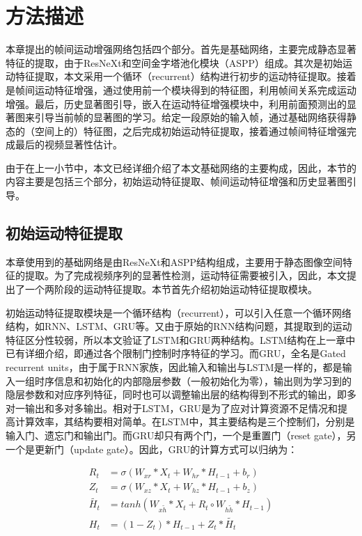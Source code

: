 \section{方法描述}
本章提出的帧间运动增强网络包括四个部分。首先是基础网络，主要完成静态显著特征的提取，由于ResNeXt和空间金字塔池化模块（ASPP）组成。其次是初始运动特征提取，本文采用一个循环（recurrent）结构进行初步的运动特征提取。接着是帧间运动特征增强，通过使用前一个模块得到的特征图，利用帧间关系完成运动增强。最后，历史显著图引导，嵌入在运动特征增强模块中，利用前面预测出的显著图来引导当前帧的显著图的学习。给定一段原始的输入帧，通过基础网络获得静态的（空间上的）特征图，之后完成初始运动特征提取，接着通过帧间特征增强完成最后的视频显著性估计。

由于在上一小节中，本文已经详细介绍了本文基础网络的主要构成，因此，本节的内容主要是包括三个部分，初始运动特征提取、帧间运动特征增强和历史显著图引导。

\subsection{初始运动特征提取}
本章使用到的基础网络是由ResNeXt和ASPP结构组成，主要用于静态图像空间特征的提取。为了完成视频序列的显著性检测，运动特征需要被引入，因此，本文提出了一个两阶段的运动特征提取。本节首先介绍初始运动特征提取模块。

初始运动特征提取模块是一个循环结构（recurrent），可以引入任意一个循环网络结构，如RNN、LSTM、GRU等。又由于原始的RNN结构问题，其提取到的运动特征区分性较弱，所以本文验证了LSTM和GRU两种结构。LSTM结构在上一章中已有详细介绍，即通过各个限制门控制时序特征的学习。而GRU，全名是Gated recurrent units，由于属于RNN家族，因此输入和输出与LSTM是一样的，都是输入一组时序信息和初始化的内部隐层参数（一般初始化为零），输出则为学习到的隐层参数和对应序列特征，同时也可以调整输出层的结构得到不形式的输出，即多对一输出和多对多输出。相对于LSTM，GRU是为了应对计算资源不足情况和提高计算效率，其结构要相对简单。在LSTM中，其主要结构是三个控制们，分别是输入门、遗忘门和输出门。而GRU却只有两个门，一个是重置门（reset gate），另一个是更新门（update gate）。因此，GRU的计算方式可以归纳为：

\begin{equation}
\label{gru}
\begin{aligned}
   R_{t}  &= \sigma(W_{xr} * X_t + W_{hr} * H_{t-1} + b_r) \\
   Z_{t}  &= \sigma(W_{xz} * X_t + W_{hz} * H_{t-1} + b_z) \\
   \tilde{H_t} &= tanh(W_{x\tilde{h}} * X_t + R_{t} \circ W_{h\tilde{h}} * H_{t-1}  ) \\
   H_t &= (1 - Z_{t}) * H_{t-1} + Z_{t} * \tilde{H_t}
 \end{aligned}
\end{equation}

